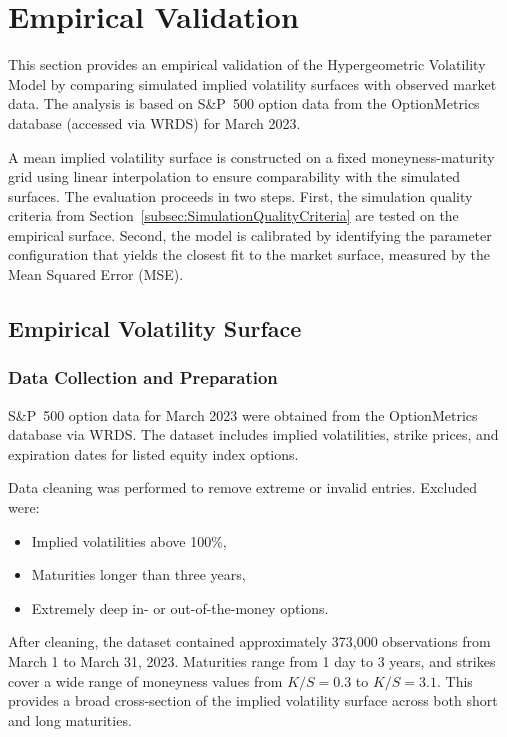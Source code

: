 \section{Empirical Validation} \label{sec:EmpiricalValidation}

This section provides an empirical validation of the Hypergeometric Volatility Model by comparing simulated implied volatility surfaces with observed market data. The analysis is based on S\&P~500 option data from the OptionMetrics database (accessed via WRDS) for March 2023.

A mean implied volatility surface is constructed on a fixed moneyness-maturity grid using linear interpolation to ensure comparability with the simulated surfaces. The evaluation proceeds in two steps. First, the simulation quality criteria from Section~\ref{subsec:SimulationQualityCriteria} are tested on the empirical surface. Second, the model is calibrated by identifying the parameter configuration that yields the closest fit to the market surface, measured by the Mean Squared Error (MSE).


\subsection{Empirical Volatility Surface} \label{subsec:EmpiricalVolatilitySurface}

\subsubsection*{Data Collection and Preparation}
S\&P~500 option data for March 2023 were obtained from the OptionMetrics database via WRDS. The dataset includes implied volatilities, strike prices, and expiration dates for listed equity index options.

Data cleaning was performed to remove extreme or invalid entries. Excluded were:
\begin{itemize}
    \item Implied volatilities above 100\%,
    \item Maturities longer than three years,
    \item Extremely deep in- or out-of-the-money options.
\end{itemize}
After cleaning, the dataset contained approximately 373{,}000 observations from March 1 to March 31, 2023. Maturities range from 1 day to 3 years, and strikes cover a wide range of moneyness values from $K/S = 0.3$ to $K/S = 3.1$. This provides a broad cross-section of the implied volatility surface across both short and long maturities.

